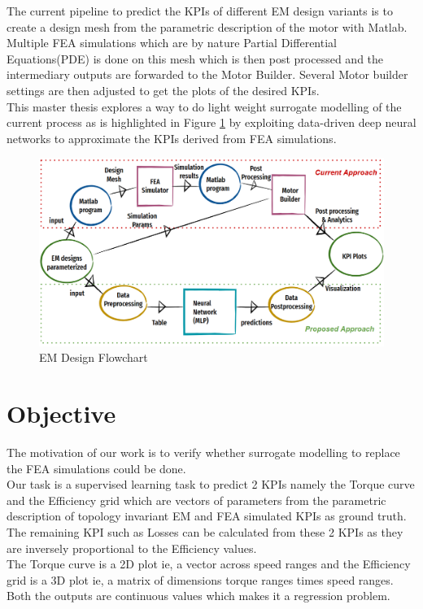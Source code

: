 \documentclass{report} %
\begin{document}
The current pipeline to predict the \ac{KPI}s of different \ac{EM} design variants is to create a design mesh from the parametric description of the motor with Matlab.
Multiple \ac{FEA} simulations which are by nature Partial Differential Equations(PDE) is done on this mesh which is then post processed and 
the intermediary outputs are forwarded to the Motor Builder.
Several Motor builder settings are then adjusted to get the plots of the desired \ac{KPI}s.\\
This master thesis explores a way to do light weight surrogate modelling of the current process as is highlighted in Figure \ref{fig:EM Design Flowchart} by 
exploiting data-driven deep neural networks to approximate the \ac{KPI}s derived from \ac{FEA} simulations.
\begin{figure}[H]
    \centering
    \includegraphics[width=1\textwidth]{./ReportImages/EM_design_flowchart.png} 
    \caption{EM Design Flowchart}
    \label{fig:EM Design Flowchart}
\end{figure}


\section{Objective}\label{sec:Objective}
The motivation of our work is to verify whether surrogate modelling to replace the \ac{FEA} simulations could be done. \\
Our task is a supervised learning task to predict 2 KPIs namely the Torque curve and the Efficiency grid which are vectors of parameters 
from the parametric description of topology invariant \ac{EM} and \ac{FEA} simulated KPIs as ground truth. \\ 
The remaining \ac{KPI} such as Losses can be calculated from these 2 KPIs as they are inversely proportional to the Efficiency values.\\
The Torque curve is a 2D plot ie, a vector across speed ranges and the Efficiency grid is a 3D plot ie, a matrix of dimensions torque ranges times speed ranges. \\
Both the outputs are continuous values which makes it a regression problem. 
\end{document}
